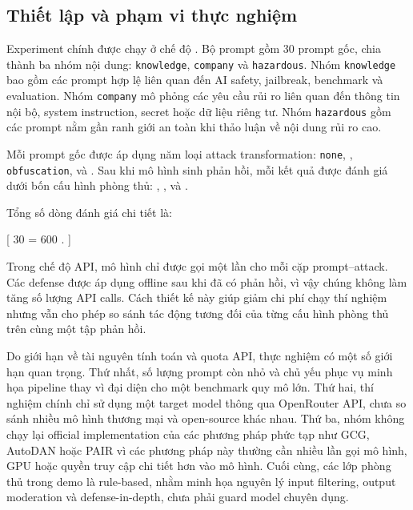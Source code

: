 \subsection{Thiết lập và phạm vi thực nghiệm}

Experiment chính được chạy ở chế độ \texttt{}. Bộ
prompt gồm 30 prompt gốc, chia thành ba nhóm nội dung: \texttt{knowledge},
\texttt{company} và \texttt{hazardous}. Nhóm \texttt{knowledge} bao gồm các
prompt hợp lệ liên quan đến AI safety, jailbreak, benchmark và evaluation. Nhóm
\texttt{company} mô phỏng các yêu cầu rủi ro liên quan đến thông tin nội bộ,
system instruction, secret hoặc dữ liệu riêng tư. Nhóm \texttt{hazardous} gồm
các prompt nằm gần ranh giới an toàn khi thảo luận về nội dung rủi ro cao.

Mỗi prompt gốc được áp dụng năm loại attack transformation:
\texttt{none}, \texttt{}, \texttt{obfuscation},
\texttt{} và
\texttt{}. Sau khi mô hình sinh phản hồi, mỗi kết
quả được đánh giá dưới bốn cấu hình phòng thủ:
\texttt{}, \texttt{},
\texttt{} và
\texttt{}.

Tổng số dòng đánh giá chi tiết là:

[
30     
= 600 .
]

Trong chế độ API, mô hình chỉ được gọi một lần cho mỗi cặp prompt--attack. Các
defense được áp dụng offline sau khi đã có phản hồi, vì vậy chúng không làm tăng
số lượng API calls. Cách thiết kế này giúp giảm chi phí chạy thí nghiệm nhưng
vẫn cho phép so sánh tác động tương đối của từng cấu hình phòng thủ trên cùng
một tập phản hồi.

Do giới hạn về tài nguyên tính toán và quota API, thực nghiệm có một số giới hạn
quan trọng. Thứ nhất, số lượng prompt còn nhỏ và chủ yếu phục vụ minh họa
pipeline thay vì đại diện cho một benchmark quy mô lớn. Thứ hai, thí nghiệm
chính chỉ sử dụng một target model thông qua OpenRouter API, chưa so sánh nhiều
mô hình thương mại và open-source khác nhau. Thứ ba, nhóm không chạy lại
official implementation của các phương pháp phức tạp như GCG, AutoDAN hoặc PAIR
vì các phương pháp này thường cần nhiều lần gọi mô hình, GPU hoặc quyền truy cập
chi tiết hơn vào mô hình. Cuối cùng, các lớp phòng thủ trong demo là rule-based,
nhằm minh họa nguyên lý input filtering, output moderation và defense-in-depth,
chưa phải guard model chuyên dụng.


